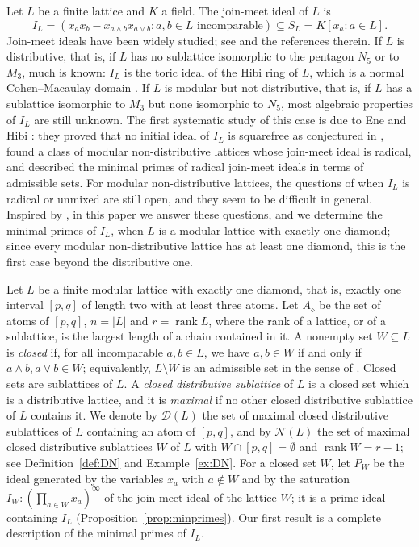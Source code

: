 \documentclass{amsart}
\theoremstyle{definition}
\DeclareMathOperator{\rk}{rank}
\newcommand{\cD}{\mathcal D}
\newcommand{\cN}{\mathcal N}
\newcommand{\dm}{\diamond}
\begin{document}
Let $L$ be a finite lattice and $K$ a field. The join-meet ideal of $L$ is
\[
I_L=(x_ax_b-x_{a\wedge b}x_{a\vee b}:a,b\in L\text{ incomparable})\subseteq S_L=K[x_a:a\in L].
\]
Join-meet ideals have been widely studied; see \cite[Chapter 6]{HHO} and the references therein. If $L$ is distributive, that is, if $L$ has no sublattice isomorphic to the pentagon $N_5$ or to $M_3$, much is known: $I_L$ is the toric ideal of the Hibi ring of $L$, which is a normal Cohen--Macaulay domain \cite{H}. If $L$ is modular but not distributive, that is, if $L$ has a sublattice isomorphic to $M_3$ but none isomorphic to $N_5$, most algebraic properties of $I_L$ are still unknown. The first systematic study of this case is due to Ene and Hibi \cite{EH}: they proved that no initial ideal of $I_L$ is squarefree as conjectured in \cite{HH12}, found a class of modular non-distributive lattices whose join-meet ideal is radical, and described the minimal primes of radical join-meet ideals in terms of admissible sets. For modular non-distributive lattices, the questions of when $I_L$ is radical or unmixed are still open, and they seem to be difficult in general. Inspired by \cite{EH}, in this paper we answer these questions, and we determine the minimal primes of $I_L$, when $L$ is a modular lattice with exactly one diamond; since every modular non-distributive lattice has at least one diamond, this is the first case beyond the distributive one.

Let $L$ be a finite modular lattice with exactly one diamond, that is, exactly one interval $[p,q]$ of length two with at least three atoms. Let $A_\dm$ be the set of atoms of $[p,q]$, $n=|L|$ and $r=\rk L$, where the rank of a lattice, or of a sublattice, is the largest length of a chain contained in it. A nonempty set $W\subseteq L$ is \emph{closed} if, for all incomparable $a,b\in L$, we have $a,b\in W$ if and only if $a\wedge b,a\vee b\in W$; equivalently, $L\setminus W$ is an admissible set in the sense of \cite[Definition 2.2]{EH}. Closed sets are sublattices of $L$. A \emph{closed distributive sublattice} of $L$ is a closed set which is a distributive lattice, and it is \emph{maximal} if no other closed distributive sublattice of $L$ contains it. We denote by $\cD(L)$ the set of maximal closed distributive sublattices of $L$ containing an atom of $[p,q]$, and by $\cN(L)$ the set of maximal closed distributive sublattices $W$ of $L$ with $W\cap[p,q]=\emptyset$ and $\rk W=r-1$; see Definition~\ref{def:DN} and Example~\ref{ex:DN}. For a closed set $W$, let $P_W$ be the ideal generated by the variables $x_a$ with $a\notin W$ and by the saturation $I_W:(\prod_{a\in W}x_a)^\infty$ of the join-meet ideal of the lattice $W$; it is a prime ideal containing $I_L$ (Proposition~\ref{prop:minprimes}). Our first result is a complete description of the minimal primes of $I_L$.
\end{document}
